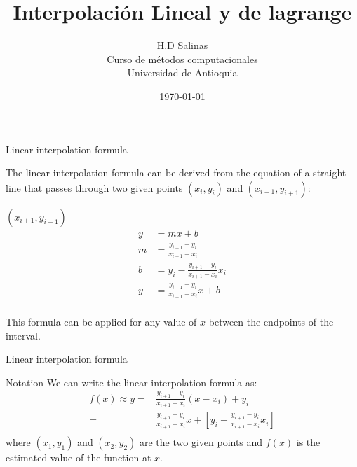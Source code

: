 \documentclass{beamer}
\title{Interpolación Lineal y de lagrange}
\author{H.D Salinas \\
Curso de métodos computacionales\\
Universidad de Antioquia\\}
\date{\today}
\begin{document}
\begin{frame}
  \titlepage
\end{frame}


\begin{frame}{Linear interpolation formula}
    
        The linear interpolation formula can be derived from the equation of a straight line that passes through two given points $(x_i,y_i)$ and $(x_{i+1},y_{i+1})$:
    
    $(x_{i+1},y_{i+1})$
        \begin{align*}
            y &= mx + b \\
            m &= \frac{y_{i+1}-y_i}{x_{i+1}-x_i} \\            
            b &= y_i-\frac{y_{i+1}-y_i}{x_{i+1}-x_i}x_i \\
            y &= \frac{y_{i+1}-y_i}{x_{i+1}-x_i}x+b \\
        \end{align*}

        This formula can be applied for any value of $x$ between the endpoints of the interval.
\end{frame}

\begin{frame}{Linear interpolation formula}
    \begin{block}{Notation}
        We can write the linear interpolation formula as:
        \begin{align}
        f(x)\approx y = &\frac{y_{i+1}-y_i}{x_{i+1}-x_i}(x-x_i) + y_i \\
        =&\frac{y_{i+1}-y_i}{x_{i+1}-x_i}x+\left[y_i-\frac{y_{i+1}-y_i}{x_{i+1}-x_i}x_i\right] \\
        \end{align}
        where $(x_1,y_1)$ and $(x_2,y_2)$ are the two given points and $f(x)$ is the estimated value of the function at $x$.
    \end{block}
\end{frame}


\begin{frame}


\end{frame}
\end{document}
